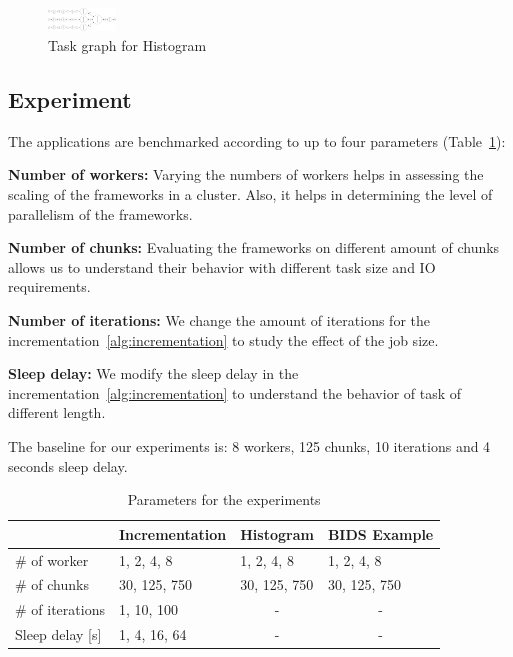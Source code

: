\documentclass[conference]{IEEEtran}
\begin{document}
\begin{figure}[!t]
    \centering
    \includegraphics[width=0.16\textwidth, angle=-90]{images/histogram-task-graph.png}
    \caption{Task graph for Histogram}\label{fig:tg-histo}
\end{figure}

\subsection{Experiment}
The applications are benchmarked according to up to four parameters
(Table~\ref{tab:param}):

\textbf{Number of workers:} Varying the numbers of workers helps in assessing the
scaling of the frameworks in a cluster. Also, it helps in determining the level of
parallelism of the frameworks.

\textbf{Number of chunks:} Evaluating the frameworks on different amount of chunks
allows us to understand their behavior with different task size and IO requirements.

\textbf{Number of iterations:} We change the amount of iterations for the
incrementation~\ref{alg:incrementation} to study the effect of the job size.

\textbf{Sleep delay:} We modify the sleep delay in the
incrementation~\ref{alg:incrementation} to understand the behavior of task of
different length.

The baseline for our experiments is: 8 workers, 125 chunks, 10 iterations and 4
seconds sleep delay.


\begin{table}[!b]
    \renewcommand{\arraystretch}{1.3}
    \caption{Parameters for the experiments}\label{tab:param}
    \centering
    \begin{tabular*}{\columnwidth}{llll}
    \hline
                        & Incrementation & Histogram             & BIDS Example          \\ \hline
    \# of worker        & 1, 2, 4, 8     & 1, 2, 4, 8            & 1, 2, 4, 8            \\
    \# of chunks        & 30, 125, 750   & 30, 125, 750          & 30, 125, 750          \\
    \# of iterations    & 1, 10, 100     & \multicolumn{1}{c}{-} & \multicolumn{1}{c}{-} \\
    Sleep delay {[}s{]} & 1, 4, 16, 64   & \multicolumn{1}{c}{-} & \multicolumn{1}{c}{-} \\ \hline
    \end{tabular*}
    \end{table}
\end{document}
